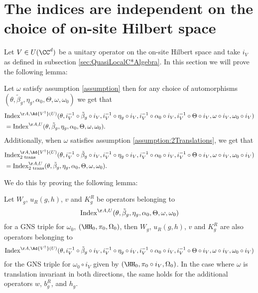 \section{The indices are independent on the choice of on-site Hilbert space}\label{sec:the-indices-are-independent-on-the-choice-of-on-site-hilbert-space}
Let $V \in U(\CC^d)$ be a unitary operator on the on-site Hilbert space and take $i_V$ as defined in subsection \ref{sec:QuasiLocalC*Algebra}. In this section we will prove the following lemma:
\begin{lemma}\label{lem:IndependenceOnChoiceOnSitHilbertSpace}
	Let $\omega$ satisfy assumption \ref{assumption} then for any choice of automorphisms $(\theta,\tilde{\beta}_g,\eta_g,\alpha_0,\Theta,\omega,\omega_0)$ we get that
	\begin{align}
		&\textrm{Index}^{\AA,\Ad{V^\dagger}(U)}(\theta,i_V^{-1}\circ\tilde{\beta}_g\circ i_V,i_V^{-1}\circ\eta_g\circ i_V,i_V^{-1}\circ\alpha_0\circ i_V,i_V^{-1}\circ\Theta\circ i_V,\omega\circ i_V,\omega_0\circ i_V)\\
		&=\textrm{Index}^{\AA,U}(\theta,\tilde{\beta}_g,\eta_g,\alpha_0,\Theta,\omega,\omega_0).
	\end{align}
	Additionally, when $\omega$ satisfies assumption \ref{assumption:2Translations}, we get that
	\begin{align}
		&\textrm{Index}^{\AA,\Ad{V^\dagger}(U)}_{\textrm{2 trans}}(\theta,i_V^{-1}\circ\tilde{\beta}_g\circ i_V,i_V^{-1}\circ\eta_g\circ i_V,i_V^{-1}\circ\alpha_0\circ i_V,i_V^{-1}\circ\Theta\circ i_V,\omega\circ i_V,\omega_0\circ i_V)\\
		&=\textrm{Index}^{\AA,U}_{\textrm{2 trans}}(\theta,\tilde{\beta}_g,\eta_g,\alpha_0,\Theta,\omega,\omega_0).
	\end{align}
\end{lemma}
We do this by proving the following lemma:
\begin{lemma}\label{lem:IndependenceOnChoiceOnSitHilbertSpaceOperatorsBelongingTo}
	Let $W_g$, $u_R(g,h)$, $v$ and $K^R_g$ be operators belonging to
	\begin{equation}
		\textrm{Index}^{\AA,U}(\theta,\tilde{\beta}_g,\eta_g,\alpha_0,\Theta,\omega,\omega_0)
	\end{equation}
	for a GNS triple for $\omega_0$, $(\HH_0,\pi_0,\Omega_0)$, then $W_g$, $u_R(g,h)$, $v$ and $K^R_g$ are also operators belonging to
	\begin{equation}
		\textrm{Index}^{\AA,\Ad{V^\dagger}(U)}(\theta,i_V^{-1}\circ\tilde{\beta}_g\circ i_V,i_V^{-1}\circ\eta_g\circ i_V,i_V^{-1}\circ\alpha_0\circ i_V,i_V^{-1}\circ\Theta\circ i_V,\omega\circ i_V,\omega_0\circ i_V)
	\end{equation}
	for the GNS triple for $\omega_0\circ i_V$ given by $(\HH_0,\pi_0\circ i_V,\Omega_0)$. In the case where $\omega$ is translation invariant in both directions, the same holds for the additional operators $w$, $b_g^R$, and $h_g$.
\end{lemma}
